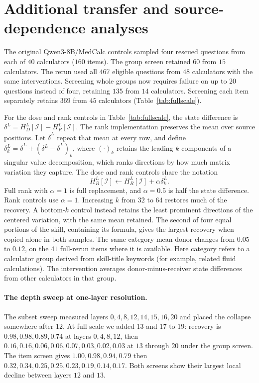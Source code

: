 \section{Additional transfer and source-dependence analyses}
\label{app:fullscale}



The original Qwen3-8B/MedCalc controls sampled four rescued questions
from each of $40$ calculators ($160$ items). The group screen retained
$60$ from $15$ calculators. The rerun used all $467$ eligible questions
from $48$ calculators with the same interventions. Screening whole
groups now requires failure on up to $20$ questions instead of four,
retaining $135$ from $14$ calculators. Screening each item separately
retains $369$ from $45$ calculators (Table~\ref{tab:fullscale}).

For the dose and rank controls in Table~\ref{tab:fullscale}, the state
difference is $\delta^L=H_D^L[\mathcal I]-H_R^L[\mathcal I]$.
The rank implementation preserves the mean over source positions.
Let $\bar\delta^L$ repeat that mean at every row, and define
$\delta_k^L=\bar\delta^L+(\delta^L-\bar\delta^L)_k$, where
$(\cdot)_k$ retains the leading $k$ components of a singular value
decomposition, which ranks directions by how much matrix variation they capture.
The dose and rank controls share the notation
\begin{equation}
H_R^L[\mathcal I]\leftarrow H_R^L[\mathcal I]+\alpha\delta_k^L.
\label{eq:dose-rank}
\end{equation}
Full rank with $\alpha=1$ is full replacement, and $\alpha=0.5$ is half
the state difference. Rank controls use $\alpha=1$.
Increasing $k$ from $32$ to $64$ restores much of the recovery.
A bottom-$k$ control instead retains the least prominent directions of
the centered variation, with the same mean retained.
The second of four equal portions of the skill, containing its formula,
gives the largest recovery when copied alone in both samples.
The same-category mean donor changes from $0.05$ to $0.12$, on the $41$
full-rerun items where it is available. Here category refers to a calculator
group derived from skill-title keywords (for example, related fluid calculations). The intervention averages
donor-minus-receiver state differences from other calculators in that group.

\paragraph{The depth sweep at one-layer resolution.} The subset sweep measured
layers $0,4,8,12,14,15,16,20$ and placed the collapse somewhere after $12$.
At full scale we added $13$ and $17$ to $19$:
recovery is $0.98,0.98,0.89,0.74$ at layers $0,4,8,12$, then
$0.16,0.16,0.06,0.06,0.07,0.03,0.02,0.03$ at $13$ through $20$ under the group screen.
The item screen gives $1.00,0.98,0.94,0.79$ then
$0.32,0.34,0.25,0.25,0.23,0.19,0.14,0.17$.
Both screens show their largest local decline
between layers $12$ and $13$.


